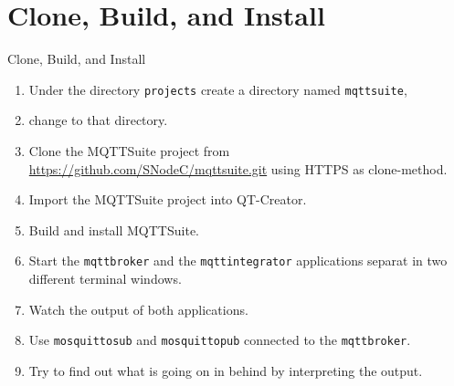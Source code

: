 \part[nopartpage]{Clone, Build, and Install }

\begin{frame}{Clone, Build, and Install}
  \begin{enumerate}
    \item Under the directory \lstinline|projects| create a directory named \lstinline|mqttsuite|,
    \item change to that directory.
    \item Clone the MQTTSuite project from \alert{\href{https://github.com/SNodeC/mqttsuite.git}{https://github.com/SNodeC/mqttsuite.git}} using \alert{HTTPS} as clone-method.
    \item Import the MQTTSuite project into QT-Creator.
    \item Build and install MQTTSuite.
    \item Start the \texttt{\alert{mqttbroker}} and the \texttt{\alert{mqttintegrator}} applications separat in two different terminal windows.
    \item Watch the output of both applications.
    \item Use \texttt{\alert{mosquitto\textunderscore{}sub}} and  \texttt{\alert{mosquitto\textunderscore{}pub}} connected to the \texttt{\alert{mqttbroker}}.
    \item Try to find out what is going on in behind by interpreting the output.
  \end{enumerate}
\end{frame}
